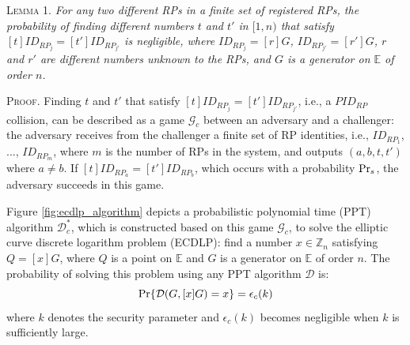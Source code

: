 \vspace{1mm}
\noindent\textsc{Lemma 1.} {\em  For any two different RPs in a finite set of registered RPs, the probability of finding different numbers $t$ and $t'$ in $[1,n)$ that satisfy $[t]ID_{RP_j} = [t']ID_{RP_{j'}}$ is negligible, where $ID_{RP_j}=[r]G$, $ID_{RP_{j'}}=[r']G$, $r$ and $r'$ are different numbers unknown to the RPs, and $G$ is a generator on $\mathbb{E}$ of order $n$.}


\oldc
\vspace{0.75mm}
\noindent\textsc{Proof.}
Finding $t$ and $t'$ that satisfy $[t]ID_{RP_j} = [t']ID_{RP_{j'}}$, i.e., a $PID_{RP}$ collision,
    can be described as a game $\mathcal{G}_c$ between an adversary and a challenger: the adversary receives from the challenger a finite set of RP identities, i.e., $ID_{RP_1}$, ..., $ID_{RP_m}$, where $m$ is the number of RPs in the system, and outputs $(a, b, t, t')$ where $a \neq b$.
    If $[t]ID_{RP_a}=[t']ID_{RP_b}$, which occurs with a probability ${\rm Pr}_s$, the adversary succeeds in this game.

Figure \ref{fig:ecdlp_algorithm} depicts a probabilistic polynomial time (PPT) algorithm $\mathcal{D}^*_c$, which is constructed based on this game $\mathcal{G}_c$, to solve the elliptic curve discrete logarithm problem (ECDLP): find a number $x \in \mathbb{Z}_n$ satisfying $Q = [x]G$,
where $Q$ is a point on $\mathbb{E}$ and $G$ is a generator on $\mathbb{E}$ of order $n$. The probability of solving this problem using any PPT algorithm $\mathcal{D}$ is:
\begin{equation*}
{\rm Pr}\{\mathcal{D}(G, [x]G)=x\} = \epsilon_{c}(k)
\end{equation*}
where $k$ denotes the security parameter and $\epsilon_{c}(k)$ becomes negligible when $k$ is sufficiently large.


